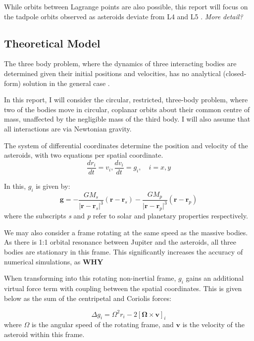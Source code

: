 \documentclass[11pt, a4paper,twocolumn]{article} %
\begin{document}
While orbits between Lagrange points are also possible, this report will focus on the tadpole orbits observed as asteroids deviate from L4 and L5 \cite{Murray1999}. \textit{More detail?}


\subsection{Theoretical Model}
The three body problem, where the dynamics of three interacting bodies are determined given their initial positions and velocities, has no analytical (closed-form) solution in the general case \cite{Barrow2008}.

In this report, I will consider the circular, restricted, three-body problem, where two of the bodies move in circular, coplanar orbits about their common centre of mass, unaffected by the negligible mass of the third body. I will also assume that all interactions are via Newtonian gravity.

The system of differential coordinates determine the position and velocity of the asteroids, with two equations per spatial coordinate.
\begin{equation}
\frac{dr_{i}}{dt} = v_{i}, \frac{dv_{i}}{dt} = g_{i}, \quad i = x,y 
\end{equation}

In this, $g_{i}$ is given by:
\begin{equation}
\textbf{g}= - \frac{G M_{s}}{\lvert \textbf{r} - \textbf{r}_{s} \rvert ^{3}} (\textbf{r} - \textbf{r}_{s})
		 - \frac{G M_{p}}{\lvert \textbf{r} - \textbf{r}_{p} \rvert ^{3}} (\textbf{r} - \textbf{r}_{p})
\end{equation}
where the subscripts \textit{s} and \textit{p} refer to solar and planetary properties respectively.

We may also consider a frame rotating at the same speed as the massive bodies. As there is 1:1 orbital resonance between Jupiter and the asteroids, all three bodies are stationary in this frame. This significantly increases the accuracy of numerical simulations, as \textbf{WHY}

When transforming into this rotating non-inertial frame, $g_{i}$ gains an additional virtual force term with coupling between the spatial coordinates. This is given below as the sum of the centripetal and Coriolis forces:

\begin{equation}
\Delta g_{i} = \Omega^{2} r_{i} - 2[\bm{\Omega} \times \textbf{v}]_{i}
\end{equation}
where $\Omega$ is the angular speed of the rotating frame, and $\textbf{v}$ is the velocity of the asteroid within this frame. 
\end{document}
